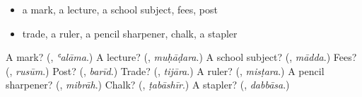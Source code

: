 \begin{itemize}
\raggedright
  \item a mark, a lecture, a school subject, fees, post
  \item trade, a ruler, a pencil sharpener, chalk, a stapler
\end{itemize}

\begin{tcolorbox}[breakable,colback=teal!4,colframe=teal!35!black,title={Before you move on}]
A mark? (\textbf{}, \emph{ʿalāma}.) A lecture? (\textbf{}, \emph{muḥāḍara}.) A school subject? (\textbf{}, \emph{mādda}.) Fees? (\textbf{}, \emph{rusūm}.) Post? (\textbf{}, \emph{barīd}.) Trade? (\textbf{}, \emph{tijāra}.) A ruler? (\textbf{}, \emph{misṭara}.) A pencil sharpener? (\textbf{}, \emph{mibrāh}.) Chalk? (\textbf{}, \emph{ṭabāshīr}.) A stapler? (\textbf{}, \emph{dabbāsa}.)
\end{tcolorbox}
